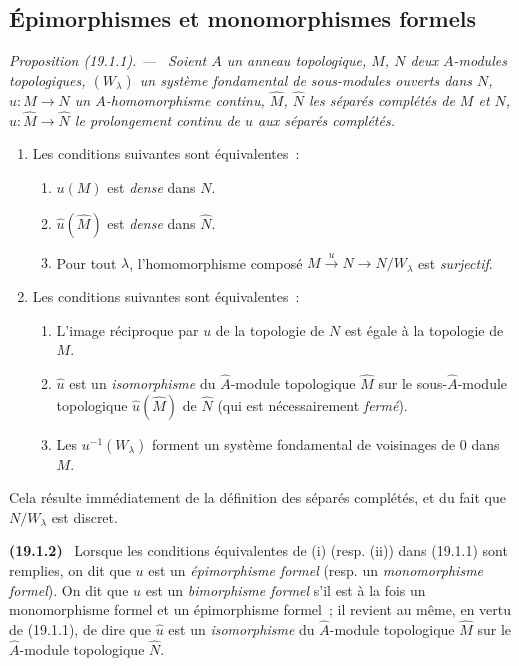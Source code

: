 \documentclass[10pt,oneside]{book}
\makeatletter
\newcommand{\setmanualcurrentlabel}[1]{\def\@currentlabel{#1}}
\newenvironment{env}[1][]{\setmanualcurrentlabel{#1}\par\medskip\noindent\textbf{(#1)}\ }{\par}
\newenvironment{proposition}[1][]{%
  \setmanualcurrentlabel{#1}\par\medskip\noindent\itshape Proposition (#1). ---\ }{\par}
\makeatother
\begin{document}
\subsection{Épimorphismes et monomorphismes formels}
\label{subsection:0.19.1-fr}

\begin{proposition}[19.1.1]
\label{0.19.1.1-fr}
Soient $A$ un anneau topologique, $M$, $N$ deux $A$-modules topologiques,
$(W_\lambda)$ un système fondamental de sous-modules ouverts dans $N$,
$u:M\to N$ un $A$-homomorphisme continu, $\widehat M$, $\widehat N$ les
séparés complétés de $M$ et $N$, $\widehat u:\widehat M\to\widehat N$ le
prolongement continu de $u$ aux séparés complétés.
\begin{enumerate}
  \item[(i)] Les conditions suivantes sont équivalentes~:
  \begin{enumerate}
    \item[a)] $u(M)$ est \emph{dense} dans $N$.
    \item[a$'$)] $\widehat u(\widehat M)$ est \emph{dense} dans $\widehat N$.
    \item[a$''$)] Pour tout $\lambda$, l'homomorphisme composé
    $M\xrightarrow{u}N\to N/W_\lambda$ est \emph{surjectif}.
  \end{enumerate}
  \item[(ii)] Les conditions suivantes sont équivalentes~:
  \begin{enumerate}
    \item[b)] L'image réciproque par $u$ de la topologie de $N$ est égale à la
    topologie de $M$.
    \item[b$'$)] $\widehat u$ est un \emph{isomorphisme} du $\widehat A$-module
    topologique $\widehat M$ sur le sous-$\widehat A$-module topologique
    $\widehat u(\widehat M)$ de $\widehat N$ (qui est nécessairement
    \emph{fermé}).
    \item[b$''$)] Les $u^{-1}(W_\lambda)$ forment un système fondamental de
    voisinages de 0 dans $M$.
  \end{enumerate}
\end{enumerate}
Cela résulte immédiatement de la définition des séparés complétés, et du fait
que $N/W_\lambda$ est discret.
\end{proposition}

\begin{env}[19.1.2]
\label{0.19.1.2-fr}
Lorsque les conditions équivalentes de (i) (resp. (ii)) dans (19.1.1) sont
remplies, on dit que $u$ est un \emph{épimorphisme formel} (resp. un
\emph{monomorphisme formel}). On dit que $u$ est un \emph{bimorphisme formel}
s'il est à la fois un monomorphisme formel et un épimorphisme formel~; il
revient au même, en vertu de (19.1.1), de dire que $\widehat u$ est un
\emph{isomorphisme} du $\widehat A$-module topologique $\widehat M$ sur le
$\widehat A$-module topologique $\widehat N$.
\end{env}
\end{document}
